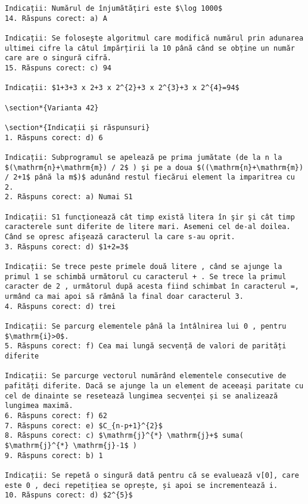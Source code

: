 \begin{verbatim}
Indicații: Numărul de înjumătăţiri este $\log 1000$
14. Răspuns corect: a) A

Indicații: Se foloseşte algoritmul care modifică numărul prin adunarea ultimei cifre la câtul împărțirii la 10 până când se obține un număr care are o singură cifră.
15. Răspuns corect: c) 94

Indicații: $1+3+3 x 2+3 x 2^{2}+3 x 2^{3}+3 x 2^{4}=94$

\section*{Varianta 42}

\section*{Indicații și răspunsuri}
1. Răspuns corect: d) 6

Indicații: Subprogramul se apelează pe prima jumătate (de la n la $(\mathrm{n}+\mathrm{m}) / 2$ ) şi pe a doua $((\mathrm{n}+\mathrm{m}) / 2+1$ până la m$)$ adunând restul fiecărui element la imparitrea cu 2.
2. Răspuns corect: a) Numai S1

Indicații: S1 funcţionează cât timp există litera în şir şi cât timp caracterele sunt diferite de litere mari. Asemeni cel de-al doilea. Când se opresc afișează caracterul la care s-au oprit.
3. Răspuns corect: d) $1+2=3$

Indicații: Se trece peste primele două litere , când se ajunge la primul 1 se schimbă următorul cu caracterul + . Se trece la primul caracter de 2 , următorul după acesta fiind schimbat în caracterul =, urmând ca mai apoi să rămână la final doar caracterul 3.
4. Răspuns corect: d) trei

Indicații: Se parcurg elementele până la întâlnirea lui 0 , pentru $\mathrm{i}>0$.
5. Răspuns corect: f) Cea mai lungă secvență de valori de parități diferite

Indicații: Se parcurge vectorul numărând elementele consecutive de pafități diferite. Dacă se ajunge la un element de aceeași paritate cu cel de dinainte se resetează lungimea secvenței și se analizează lungimea maximă.
6. Răspuns corect: f) 62
7. Răspuns corect: e) $C_{n-p+1}^{2}$
8. Răspuns corect: c) $\mathrm{j}^{*} \mathrm{j}+$ suma( $\mathrm{j}^{*} \mathrm{j}-1$ )
9. Răspuns corect: b) 1

Indicații: Se repetă o singură dată pentru că se evaluează v[0], care este 0 , deci repetițiea se oprește, și apoi se incrementează i.
10. Răspuns corect: d) $2^{5}$


\end{verbatim}
